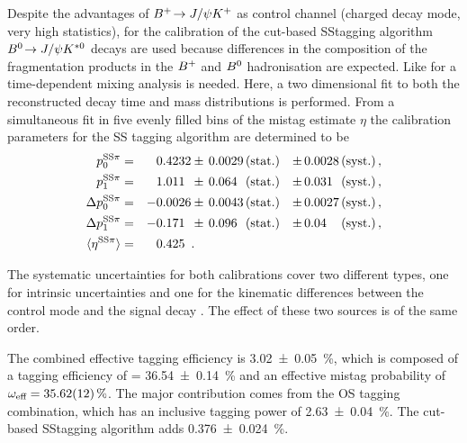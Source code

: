 Despite the advantages of $\BuToJPsiK$ as control channel (charged decay mode,
very high statistics), for the calibration of the cut-based SS\pion tagging
algorithm $\BdToJPsiKstar$ decays are used because differences in the
composition of the fragmentation products in the $\Bp$ and $\Bz$ hadronisation
are expected. Like for \BdToDsD a time-dependent mixing analysis is needed.
Here, a two dimensional fit to both the reconstructed decay time and mass
distributions is performed. From a simultaneous fit in five evenly filled bins
of the mistag estimate $\eta$ the calibration parameters for the SS\pion
tagging algorithm are determined to be
\begin{equation}
\begin{aligned}
  p_0^{\text{SS\pion}}        &=& \phantom{+}0.4232  &\pm\, 0.0029 \text{\,(stat.)} &\pm\, 0.0028 \text{\,(syst.)} \, ,\\
  p_1^{\text{SS\pion}}        &=& \phantom{+}1.011\phantom{0}   &\pm\, 0.064\phantom{0} \text{\,(stat.)} &\pm\, 0.031\phantom{0} \text{\,(syst.)} \, ,\\
  \Delta p_0^{\text{SS\pion}} &=& -0.0026 &\pm\, 0.0043 \text{\,(stat.)} &\pm\, 0.0027 \text{\,(syst.)} \, , \\
  \Delta p_1^{\text{SS\pion}} &=& -0.171\phantom{0}   &\pm\, 0.096\phantom{0} \text{\,(stat.)} &\pm\, 0.04\phantom{00} \text{\,(syst.)} \, , \\
  \langle\eta^{\text{SS\pion}}\rangle        &=& \phantom{+}0.425\phantom{0} & .
\end{aligned}
\label{eq:dataanalysis:taggingcalibration:jpsixcalibration:ss_calibration_pars}
\end{equation}

The systematic uncertainties for both calibrations cover two different types,
one for intrinsic uncertainties and one for the kinematic differences between
the control mode and the signal decay \BdToJPsiKS. The effect of these two
sources is of the same order.

The combined effective tagging efficiency is \SI{3.02\pm0.05}{\percent}, which
is composed of a tagging efficiency of \etag = \SI{36.54\pm0.14}{\percent} and
an effective mistag probability of $\mistag_{\textrm{eff}} =
\SI{35.62\pm0.12}{\percent}$. The major contribution comes from the OS tagging
combination, which has an inclusive tagging power of
\SI{2.63\pm0.04}{\percent}. The cut-based SS\pion tagging algorithm adds
\SI{0.376\pm0.024}{\percent}.